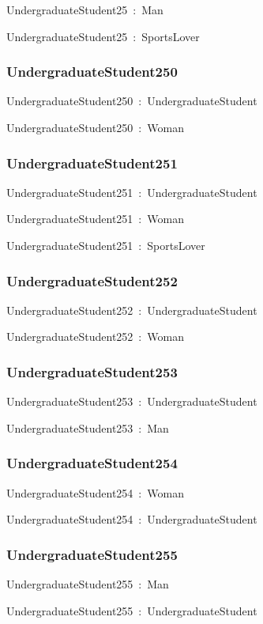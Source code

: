\documentclass{article}
\begin{document}
UndergraduateStudent25~:~Man

UndergraduateStudent25~:~SportsLover

\subsubsection*{UndergraduateStudent250}

UndergraduateStudent250~:~UndergraduateStudent

UndergraduateStudent250~:~Woman

\subsubsection*{UndergraduateStudent251}

UndergraduateStudent251~:~UndergraduateStudent

UndergraduateStudent251~:~Woman

UndergraduateStudent251~:~SportsLover

\subsubsection*{UndergraduateStudent252}

UndergraduateStudent252~:~UndergraduateStudent

UndergraduateStudent252~:~Woman

\subsubsection*{UndergraduateStudent253}

UndergraduateStudent253~:~UndergraduateStudent

UndergraduateStudent253~:~Man

\subsubsection*{UndergraduateStudent254}

UndergraduateStudent254~:~Woman

UndergraduateStudent254~:~UndergraduateStudent

\subsubsection*{UndergraduateStudent255}

UndergraduateStudent255~:~Man

UndergraduateStudent255~:~UndergraduateStudent
\end{document}
